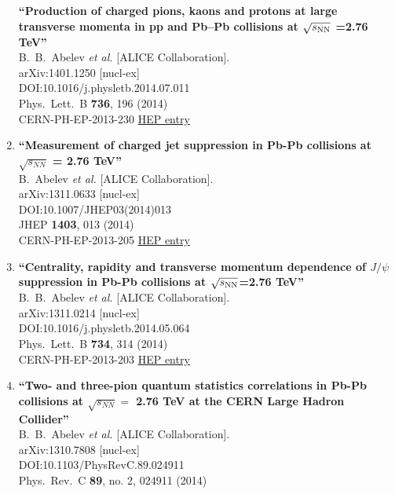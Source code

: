 \begin{enumerate}
{\bf ``Production of charged pions, kaons and protons at large transverse momenta in pp and Pb–Pb collisions at $\sqrt{s_{\rm NN}}$ =2.76 TeV''}
  \\{}B.~B.~Abelev {\it et al.} [ALICE Collaboration].
  \\{}arXiv:1401.1250 [nucl-ex]
  \\{}DOI:10.1016/j.physletb.2014.07.011
  \\{}Phys.\ Lett.\ B {\bf 736}, 196 (2014)
  \\{}CERN-PH-EP-2013-230
\href{http://inspirehep.net/record/1276299}{HEP entry}
\item%
{\bf ``Measurement of charged jet suppression in Pb-Pb collisions at $\sqrt{s_{NN}}$ = 2.76 TeV''}
  \\{}B.~Abelev {\it et al.} [ALICE Collaboration].
  \\{}arXiv:1311.0633 [nucl-ex]
  \\{}DOI:10.1007/JHEP03(2014)013
  \\{}JHEP {\bf 1403}, 013 (2014)
  \\{}CERN-PH-EP-2013-205
\href{http://inspirehep.net/record/1263194}{HEP entry}
\item%
{\bf ``Centrality, rapidity and transverse momentum dependence of $J/\psi$ suppression in Pb-Pb collisions at $\sqrt{s_{\rm NN}}$=2.76 TeV''}
  \\{}B.~B.~Abelev {\it et al.} [ALICE Collaboration].
  \\{}arXiv:1311.0214 [nucl-ex]
  \\{}DOI:10.1016/j.physletb.2014.05.064
  \\{}Phys.\ Lett.\ B {\bf 734}, 314 (2014)
  \\{}CERN-PH-EP-2013-203
\href{http://inspirehep.net/record/1263062}{HEP entry}
\item%
{\bf ``Two- and three-pion quantum statistics correlations in Pb-Pb collisions at $\sqrt{{s}_{NN}} =$ 2.76 TeV at the CERN Large Hadron Collider''}
  \\{}B.~B.~Abelev {\it et al.} [ALICE Collaboration].
  \\{}arXiv:1310.7808 [nucl-ex]
  \\{}DOI:10.1103/PhysRevC.89.024911
  \\{}Phys.\ Rev.\ C {\bf 89}, no. 2, 024911 (2014)

\end{enumerate}

